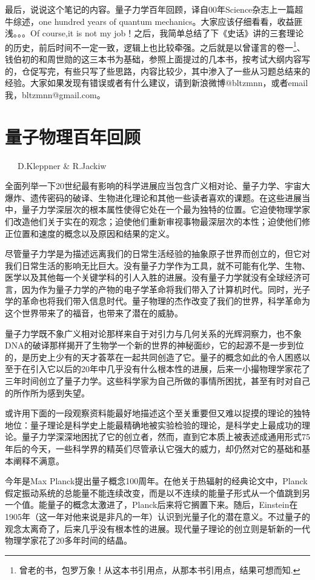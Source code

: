 \documentclass[13pt,a4paper]{article}
\begin{document}
\begin{CJK}{UTF8}{song}
  最后，说说这个笔记的内容。量子力学百年回顾，译自00年Science杂志上一篇超牛综述，one hundred years of quantum mechanics。大家应该仔细看看，收益匪浅。。。Of course,it is not my job！之后，我简单总结了下《史话》讲的三套理论的历史，前后时间不一定一致，逻辑上也比较牵强。之后就是以曾谨言的卷一\footnote{曾老的书，包罗万象！从这本书引用点，从那本书引用点，结果可想而知.}、钱伯初的和周世勋的这三本书为基础，参照上面提过的几本书，按考试大纲内容写的，仓促写完，有些只写了些思路，内容比较少，其中渗入了一些从习题总结来的经验。大家如果发现有错误或者有什么建议，请到新浪微博@bltzmnn，或者email我，bltzmnn@gmail.com。
  


\section{量子物理百年回顾}

\ \ \ D.Kleppner \& R.Jackiw

全面列举一下20世纪最有影响的科学进展应当包含广义相对论、量子力学、宇宙大爆炸、遗传密码的破译、生物进化理论和其他一些读者喜欢的课题。在这些进展当中，量子力学深层次的根本属性使得它处在一个最为独特的位置。它迫使物理学家们改造他们关于实在的观念；迫使他们重新审视事物最深层次的本性；迫使他们修正位置和速度的概念以及原因和结果的定义。

尽管量子力学是为描述远离我们的日常生活经验的抽象原子世界而创立的，但它对我们日常生活的影响无比巨大。没有量子力学作为工具，就不可能有化学、生物、医学以及其他每一个关键学科的引人入胜的进展。没有量子力学就没有全球经济可言，因为作为量子力学的产物的电子学革命将我们带入了计算机时代。同时，光子学的革命也将我们带入信息时代。量子物理的杰作改变了我们的世界，科学革命为这个世界带来了的福音，也带来了潜在的威胁。

量子力学既不象广义相对论那样来自于对引力与几何关系的光辉洞察力，也不象DNA的破译那样揭开了生物学一个新的世界的神秘面纱，它的起源不是一步到位的，是历史上少有的天才荟萃在一起共同创造了它。量子的概念如此的令人困惑以至于在引入它以后的20年中几乎没有什么根本性的进展，后来一小撮物理学家花了三年时间创立了量子力学。这些科学家为自己所做的事情所困扰，甚至有时对自己的所作所为感到失望。

或许用下面的一段观察资料能最好地描述这个至关重要但又难以捉摸的理论的独特地位：量子理论是科学史上能最精确地被实验检验的理论，是科学史上最成功的理论。量子力学深深地困扰了它的创立者，然而，直到它本质上被表述成通用形式75年后的今天，一些科学界的精英们尽管承认它强大的威力，却仍然对它的基础和基本阐释不满意。

今年是Max Planck提出量子概念100周年。在他关于热辐射的经典论文中，Planck假定振动系统的总能量不能连续改变，而是以不连续的能量子形式从一个值跳到另一个值。能量子的概念太激进了，Planck后来将它搁置下来。随后，Einstein在1905年（这一年对他来说是非凡的一年）认识到光量子化的潜在意义。不过量子的观念太离奇了，后来几乎没有根本性的进展。现代量子理论的创立则是斩新的一代物理学家花了20多年时间的结晶。


\end{CJK}
\end{document}
